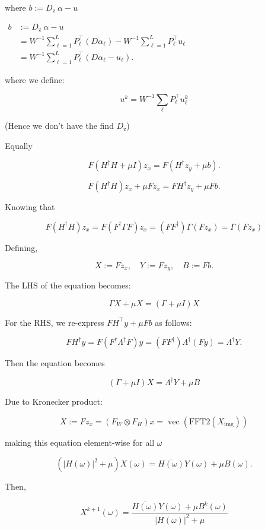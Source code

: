\documentclass{article}
\theoremstyle{definition}
\begin{document}
where $b:=D_{\text {z }} \alpha-u$


$\begin{aligned} b & :=D_{\text {z }} \alpha-u \\ & =W^{-1} \sum_{\ell=1}^L P_{\ell}^{\top}\left(D \alpha_{\ell}\right)-W^{-1} \sum_{\ell=1}^L P_{\ell}^{\top} u_{\ell} \\ & =W^{-1} \sum_{\ell=1}^L P_{\ell}^{\top}\left(D \alpha_{\ell}-u_{\ell}\right) .\end{aligned}$


where we define:

$$
u^k=W^{-1} \sum_{\ell} P_{\ell}^{\top} u_{\ell}^k
$$


(Hence we don't have the find $D_{\text{z}}$)

Equally 

$$
F\left(H^{\dagger} H+\mu I\right) z_x=F\left(H^{\dagger} z_y+\mu b\right) .
$$

$$
F\left(H^{\dagger} H\right) z_x+\mu F z_x=F H^{\dagger} z_y+\mu F b .
$$

Knowing that 

$$
F\left(H^{\dagger} H\right) z_x=F\left(F^{\dagger} \Gamma F\right) z_x=\left(F F^{\dagger}\right) \Gamma(F z_x)=\Gamma(F z_x)
$$

Defining,

$$
X:=F z_x, \quad Y:=F z_y, \quad B:=F b .
$$

The LHS of the equation becomes:

$$
\Gamma X+\mu X=(\Gamma+\mu I) X
$$

For the RHS, we re-express $F H^{\top} y+\mu F b$ as follows:

$$
F H^{\dagger} y=F\left(F^{\dagger} \Lambda^{\dagger} F\right) y=\left(F F^{\dagger}\right) \Lambda^{\dagger}(F y)=\Lambda^{\dagger} Y .
$$

Then the equation becomes 

$$
(\Gamma+\mu I) X=\Lambda^{\dagger} Y+\mu B
$$

Due to Kronecker product:

$$
X:=Fz_x=\left(F_W \otimes F_H\right) x=\operatorname{vec}\left(\mathrm{FFT} 2\left(X_{\mathrm{img}}\right)\right)
$$

making this equation element-wise for all $\omega$

$$
\left(|H(\omega)|^2+\mu\right) X(\omega)=\overline{H(\omega)} Y(\omega)+\mu B(\omega) .
$$

Then,

$$
X^{k+1}(\omega)=\frac{\overline{H(\omega)} Y(\omega)+\mu B^k(\omega)}{|H(\omega)|^2+\mu}
$$
\end{document}
